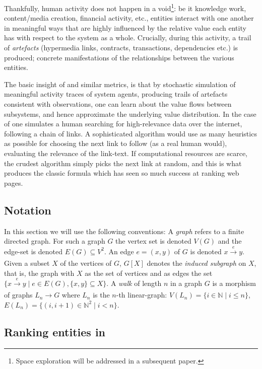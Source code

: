 Thankfully, human activity does not happen in a void\footnote{Space
  exploration will be addressed in a subsequent paper.}: be it
knowledge work, content/media creation, financial activity, etc.,
entities interact with one another in meaningful ways that are highly
influenced by the relative value each entity has with respect to the
system as a whole. Crucially, during this activity, a trail of
\emph{artefacts} (hypermedia links, contracts, transactions,
dependencies etc.) is produced; concrete manifestations
of the relationships between the various entities.

The basic insight of \pagerank{} and similar metrics, is that by
stochastic simulation of meaningful activity traces of system agents,
producing trails of artefacts consistent with observations, one can
learn about the value flows between subsystems, and hence approximate
the underlying value distribution. In the case of \pagerank{} one
simulates a human searching for high-relevance data over the internet,
following a chain of links. A sophisticated algorithm would use as
many heuristics as possible for choosing the next link to follow (as a
real human would), \eg{} evaluating the relevance of the link-text. If
computational resources are scarce, the crudest algorithm simply picks
the next link at random, and this is what produces the classic
\pagerank{} formula which has seen so much success at ranking web
pages.

\subsection{Notation}

In this section we will use the following conventions: A \emph{graph} refers to
a finite directed graph. For such a graph $G$ the vertex set is denoted $V(G)$
and the edge-set is denoted $E(G) \subseteq V^2$. An edge $e = (x,y)$ of $G$ is
denoted $x \xrightarrow[]{e} y$. Given a subset $X$ of the vertices of $G$,
$G[X]$ denotes the \emph{induced subgraph} on $X$, that is, the graph with $X$
as the set of vertices and as edges the set
$\{ x \xrightarrow[]{e} y \mid e \in E(G), \{x,y\} \subseteq X\}$. A \emph{walk}
of length $n$ in a graph $G$ is a morphism of graphs $L_n \to G$ where $L_n$ is
the $n$-th linear-graph: $V(L_n) = \{i \in \mathbb{N} \mid i \leq n \}$,
$E(L_n) = \{ (i,i+1) \in \mathbb{N}^2 \mid i < n \}$.

\subsection{Ranking entities in \oscoin{}}
\label{s:netgraph}

